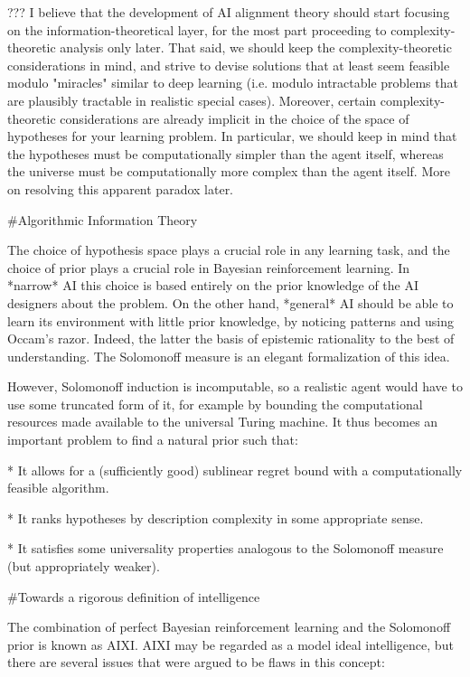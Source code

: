 \documentclass[a4paper]{article}
\begin{document}
??? I believe that the development of AI alignment theory should start focusing on the information-theoretical layer, for the most part proceeding to complexity-theoretic analysis only later. That said, we should keep the complexity-theoretic considerations in mind, and strive to devise solutions that at least seem feasible modulo "miracles" similar to deep learning (i.e. modulo intractable problems that are plausibly tractable in realistic special cases). Moreover, certain complexity-theoretic considerations are already implicit in the choice of the space of hypotheses for your learning problem. In particular, we should keep in mind that the hypotheses must be computationally simpler than the agent itself, whereas the universe must be computationally more complex than the agent itself. More on resolving this apparent paradox later.

\#Algorithmic Information Theory

The choice of hypothesis space plays a crucial role in any learning task, and the choice of prior plays a crucial role in Bayesian reinforcement learning. In *narrow* AI this choice is based entirely on the prior knowledge of the AI designers about the problem. On the other hand, *general* AI should be able to learn its environment with little prior knowledge, by noticing patterns and using Occam's razor. Indeed, the latter the basis of epistemic rationality to the best of understanding. The Solomonoff measure is an elegant formalization of this idea.

However, Solomonoff induction is incomputable, so a realistic agent would have to use some truncated form of it, for example by bounding the computational resources made available to the universal Turing machine. It thus becomes an important problem to find a natural prior such that:

* It allows for a (sufficiently good) sublinear regret bound with a computationally feasible algorithm.

* It ranks hypotheses by description complexity in some appropriate sense.

* It satisfies some universality properties analogous to the Solomonoff measure (but appropriately weaker).

\#Towards a rigorous definition of intelligence

The combination of perfect Bayesian reinforcement learning and the Solomonoff prior is known as AIXI. AIXI may be regarded as a model ideal intelligence, but there are several issues that were argued to be flaws in this concept:
\end{document}
